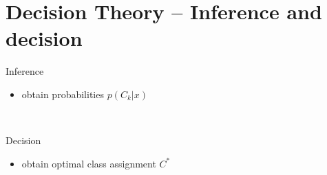 \section{Decision Theory -- Inference and decision}
\begin{minipage}{1\textwidth}
	\vspace*{5pt}
	\begin{minipage}[t]{.48\textwidth}
		\vspace*{5pt}
		\centerline{\Large{}Inference}
		\vspace*{5pt}
		\begin{itemize}
			\item obtain probabilities $p(C_k|x)$
		\end{itemize}
		~\\%
	\end{minipage}
	\hfill\vrule\hfill
	\begin{minipage}[t]{.48\textwidth}
		\vspace*{5pt}
		\centerline{\Large{}Decision}
		\vspace*{5pt}
		\begin{itemize}
			\item obtain optimal class assignment $C^*$
		\end{itemize}
		~\\%
	\end{minipage}
\end{minipage}
%
%
%
\clearpage
